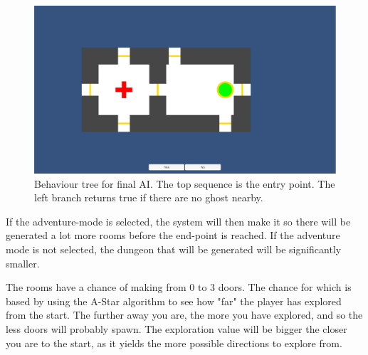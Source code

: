 \documentclass[conference,compsoc]{IEEEtran}
\begin{document}
\begin{figure}[h]
	\graphicspath{{figures/}}
	\includegraphics[width = \columnwidth ]{DialogSet.png}
	\caption{Behaviour tree for final AI. The top sequence is the entry point. The left branch returns true if there are no ghost nearby.}
	\label{fig:behavTree}
\end{figure}

If the adventure-mode is selected, the system will then make it so there will be generated a lot more rooms before the end-point is reached. If the adventure mode is not selected, the dungeon that will be generated will be significantly smaller. 

The rooms have a chance of making from 0 to 3 doors. The chance for which is based by using the A-Star algorithm to see how "far" the player has explored from the start. The further away you are, the more you have explored, and so the less doors will probably spawn. The exploration value will be bigger the closer you are to the start, as it yields the more possible directions to explore from.
\end{document}

